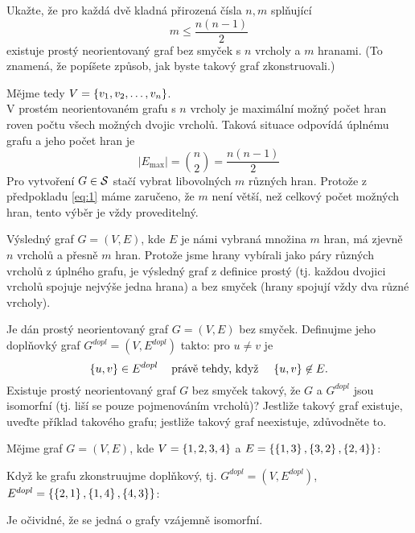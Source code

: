 \documentclass[11pt,a4paper]{article}
\begin{document}
\newpage
\begin{exercise}
Ukažte, že pro každá dvě kladná přirozená čísla $n, m$ splňující
\begin{equation}\label{eq:1}
    m \leq \frac{n(n-1)}{2}
\end{equation}
existuje prostý neorientovaný graf bez smyček s $n$ vrcholy a $m$ hranami. (To znamená, že popíšete způsob, jak byste
takový graf zkonstruovali.)
\end{exercise}

\begin{solution}
Mějme tedy $V=\bc{v_1, v_2, \dots, v_n}$. \\
V prostém neorientovaném grafu s $n$ vrcholy je maximální možný počet hran roven počtu všech možných dvojic vrcholů.
Taková situace odpovídá úplnému grafu a jeho počet hran je
\begin{equation}
    |E_{\max{}}| = \binom{n}{2} = \frac{n(n-1)}{2}
\end{equation}
Pro vytvoření $G \in \S$ stačí vybrat libovolných $m$ různých hran. Protože z předpokladu \eqref{eq:1} máme zaručeno, že
$m$ není větší, než celkový počet možných hran, tento výběr je vždy proveditelný.

Výsledný graf $G = (V,E)$, kde $E$ je námi vybraná množina $m$ hran, má zjevně $n$ vrcholů a přesně $m$ hran. Protože
jsme hrany vybírali jako páry různých vrcholů z úplného grafu, je výsledný graf z definice prostý (tj. každou dvojici
vrcholů spojuje nejvýše jedna hrana) a bez smyček (hrany spojují vždy dva různé vrcholy).
\end{solution}

\begin{exercise}
Je dán prostý neorientovaný graf $G = (V,E)$ bez smyček. Definujme jeho doplňovký graf $G^{dopl} =
(V, E^{dopl})$ takto: pro $u \not= v$ je
\[
    \bc{u, v} \in E^{dopl} \hspace{3mm} \text{ právě tehdy, když } \hspace{3mm} \bc{u, v} \not\in E.
\]
Existuje prostý neorientovaný graf $G$ bez smyček takový, že $G$ a $G^{dopl}$ jsou isomorfní (tj. liší se pouze
pojmenováním vrcholů)? Jestliže takový graf existuje, uveďte příklad takového grafu; jestliže takový graf neexistuje,
zdůvodněte to.
\end{exercise}

\begin{solution}
Mějme graf $G=(V,E)$, kde $V=\bc{1,2,3,4}$ a $E=\bc{\bc{1,3}, \bc{3,2}, \bc{2,4}}$:
\begin{figure}[H]
    \centering
\end{figure}
Když ke grafu zkonstruujme doplňkový, tj. $G^{dopl} = (V, E^{dopl})$, $E^{dopl} = \bc{\bc{2,1}, \bc{1,4}, \bc{4,3}}$:
\begin{figure}[H]
    \centering
\end{figure}
Je očividné, že se jedná o grafy vzájemně isomorfní.
\end{solution}
\end{document}
